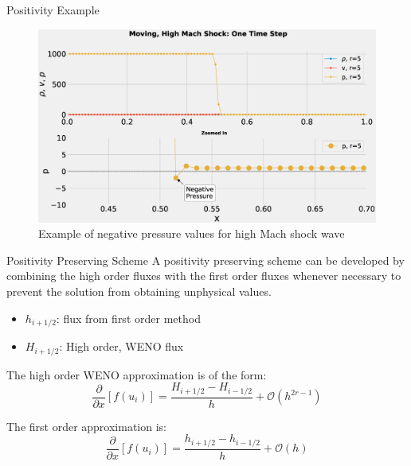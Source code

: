 \documentclass[9pt]{beamer}
\begin{document}
\begin{frame}{Positivity Example}
  \begin{figure}[H]
    \centering
    \includegraphics[scale=0.275]{PositivityZoom.eps}\caption{Example of negative pressure values for high Mach shock wave}
    \end{figure}
\end{frame}






\begin{frame}{Positivity Preserving Scheme}
  A positivity preserving scheme can be developed by combining the high order fluxes with the first order fluxes whenever necessary to prevent the solution from obtaining unphysical values.
  \begin{itemize}
    \item $h_{i+1/2}$: flux from first order method
    \item $H_{i+1/2}$: High order, WENO flux
  \end{itemize}
  
  The high order WENO approximation is of the form:
  $$
  \frac{\partial}{\partial x}[f(u_i)] = \frac{H_{i+1 /2} - H_{i-1/2}}{h}+\mathcal{O}(h^{2r-1})
  $$

  The first order approximation is:
  $$
  \frac{\partial}{\partial x}[f(u_i)] = \frac{h_{i+1 /2} - h_{i-1/2}}{h}+\mathcal{O}(h)
  $$
\end{frame}
\end{document}
